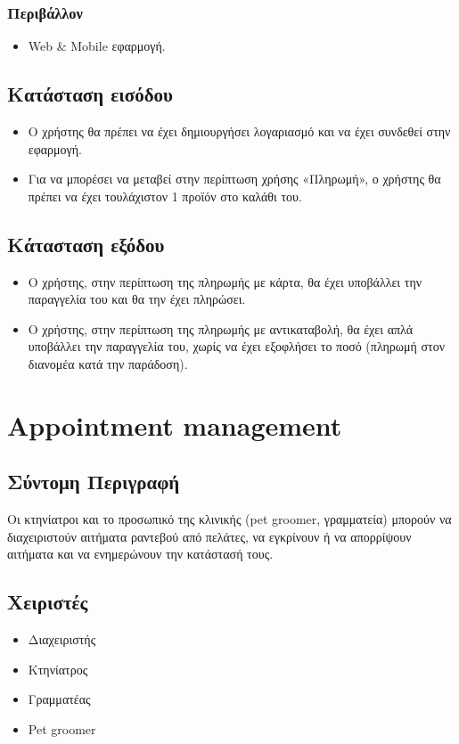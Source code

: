 \documentclass[12pt,a4paper,twoside]{book}
\begin{document}
\subsubsection{Περιβάλλον}
\begin{itemize}
  \item Web \& Mobile εφαρμογή.
\end{itemize}

\subsection{Κατάσταση εισόδου} %
\begin{itemize}
  \item Ο χρήστης θα πρέπει να έχει δημιουργήσει λογαριασμό και να έχει συνδεθεί στην εφαρμογή. %
  \item Για να μπορέσει να μεταβεί στην περίπτωση χρήσης «Πληρωμή», ο χρήστης θα πρέπει να έχει τουλάχιστον 1 προϊόν στο καλάθι του.
\end{itemize}

\subsection{Κάτασταση εξόδου} %
\begin{itemize}
  \item	Ο χρήστης, στην περίπτωση της πληρωμής με κάρτα, θα έχει υποβάλλει την παραγγελία του και θα την έχει πληρώσει. %
  \item Ο χρήστης, στην περίπτωση της πληρωμής με αντικαταβολή, θα έχει απλά υποβάλλει την παραγγελία του, χωρίς να έχει εξοφλήσει το ποσό (πληρωμή στον διανομέα κατά την παράδοση). %
\end{itemize}

\section{Appointment management}

\subsection{Σύντομη Περιγραφή}
Οι κτηνίατροι και το προσωπικό της κλινικής (pet groomer, γραμματεία) μπορούν να διαχειριστούν αιτήματα ραντεβού από πελάτες, να εγκρίνουν ή να απορρίψουν αιτήματα και να ενημερώνουν την κατάστασή τους. %

\subsection{Χειριστές}
\begin{itemize}
  \item Διαχειριστής
  \item Κτηνίατρος
  \item Γραμματέας
  \item Pet groomer
\end{itemize}
\end{document}
